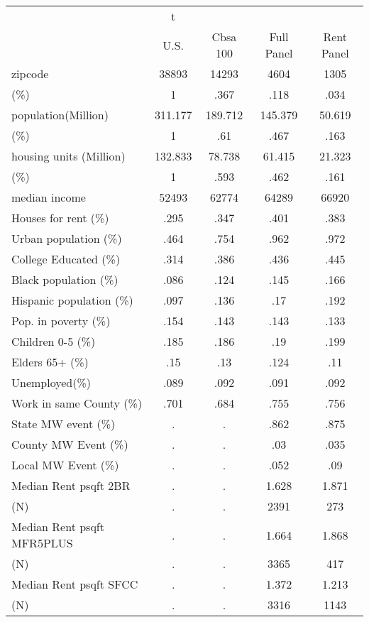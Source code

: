 \begin{tabular}{l*{4}{c}}
\hline\hline
            &           t&            &            &            \\
            &        U.S.&    Cbsa 100&  Full Panel&  Rent Panel\\
\hline
zipcode     &       38893&       14293&        4604&        1305\\
(\%)        &           1&        .367&        .118&        .034\\
population(Million)&     311.177&     189.712&     145.379&      50.619\\
(\%)        &           1&         .61&        .467&        .163\\
housing units (Million)&     132.833&      78.738&      61.415&      21.323\\
(\%)        &           1&        .593&        .462&        .161\\
median income&       52493&       62774&       64289&       66920\\
Houses for rent (\%)&        .295&        .347&        .401&        .383\\
Urban population (\%)&        .464&        .754&        .962&        .972\\
College Educated (\%)&        .314&        .386&        .436&        .445\\
Black population (\%)&        .086&        .124&        .145&        .166\\
Hispanic population (\%)&        .097&        .136&         .17&        .192\\
Pop. in poverty (\%)&        .154&        .143&        .143&        .133\\
Children 0-5 (\%)&        .185&        .186&         .19&        .199\\
Elders 65+ (\%)&         .15&         .13&        .124&         .11\\
Unemployed(\%)&        .089&        .092&        .091&        .092\\
Work in same County (\%)&        .701&        .684&        .755&        .756\\
State MW event (\%)&           .&           .&        .862&        .875\\
County MW Event (\%)&           .&           .&         .03&        .035\\
Local MW Event (\%)&           .&           .&        .052&         .09\\
Median Rent psqft 2BR&           .&           .&       1.628&       1.871\\
(N)         &           .&           .&        2391&         273\\
Median Rent psqft MFR5PLUS&           .&           .&       1.664&       1.868\\
(N)         &           .&           .&        3365&         417\\
Median Rent psqft SFCC&           .&           .&       1.372&       1.213\\
(N)         &           .&           .&        3316&        1143\\
\hline\hline
\end{tabular}
